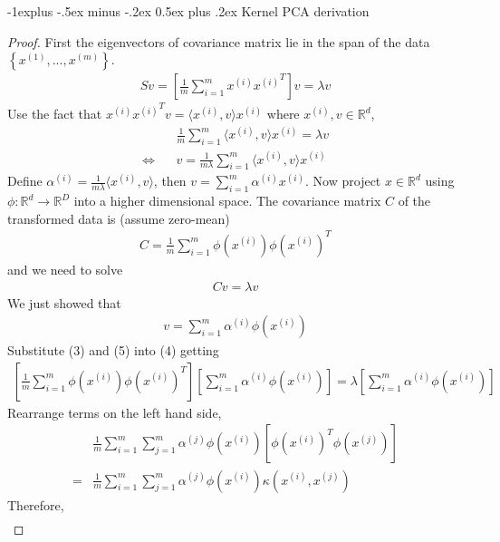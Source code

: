 \documentclass[10pt,landscape]{article}
\makeatletter
\renewcommand{\subsection}{\@startsection{subsection}{2}{0mm}%
                                {-1explus -.5ex minus -.2ex}%
                                {0.5ex plus .2ex}%
                                {\normalfont\small\bfseries}}
\makeatother
\begin{document}
\begin{multicols}{3}
\subsection{Kernel PCA derivation}
\begin{proof}
	First the eigenvectors of covariance matrix lie in the span of the data $\left\{ x^{(1)}, ..., x^{(m)} \right\}$.
	\begin{align*}
		Sv = \left[ \frac{1}{m} \sum_{i=1}^m x^{(i)}{x^{(i)}}^T \right]v = \lambda v
	\end{align*}
	Use the fact that $x^{(i)} {x^{(i)}}^T v = \langle x^{(i)}, v \rangle x^{(i)}$ where $x^{(i)}, v \in \mathbb{R}^d$,
	\begin{align*}
		&\frac{1}{m} \sum_{i=1}^m \langle x^{(i)}, v \rangle x^{(i)} = \lambda v\\
		\Leftrightarrow \ \ \ \ &v = \frac{1}{m \lambda} \sum_{i=1}^m \langle x^{(i)}, v \rangle x^{(i)}
	\end{align*}
	Define $\alpha^{(i)} = \frac{1}{m \lambda} \langle x^{(i)}, v \rangle$, then $v = \sum_{i=1}^m \alpha^{(i)} x^{(i)}$. Now project $x \in \mathbb{R}^d$ using $\phi: \mathbb{R}^d \rightarrow \mathbb{R}^D$ into a higher dimensional space. The covariance matrix $C$ of the transformed data is (assume zero-mean)
	\begin{align}
		C = \frac{1}{m} \sum_{i=1}^m \phi(x^{(i)}) \phi(x^{(i)})^T
	\end{align}
	and we need to solve
	\begin{align}
		Cv = \lambda v
	\end{align}
	We just showed that
	\begin{align}
		v = \sum_{i=1}^m \alpha^{(i)} \phi(x^{(i)})
	\end{align}
	Substitute (3) and (5) into (4) getting
	\begin{align*}
		\left[ \frac{1}{m} \sum_{i=1}^m \phi(x^{(i)}) \phi(x^{(i)})^T \right] \left[ \sum_{i=1}^m \alpha^{(i)} \phi(x^{(i)}) \right] = \lambda \left[ \sum_{i=1}^m \alpha^{(i)} \phi(x^{(i)}) \right]
	\end{align*}
	Rearrange terms on the left hand side,
	\begin{align*}
		&\frac{1}{m} \sum_{i=1}^m \sum_{j=1}^m \alpha^{(j)} \phi(x^{(i)}) \left[ {\phi(x^{(i)})}^T \phi(x^{(j)}) \right]\\
		=&\frac{1}{m} \sum_{i=1}^m \sum_{j=1}^m \alpha^{(j)} \phi(x^{(i)}) \kappa(x^{(i)}, x^{(j)})
	\end{align*}
	Therefore,
	\begin{align*}

\end{align*}
\end{proof}
\end{multicols}
\end{document}
